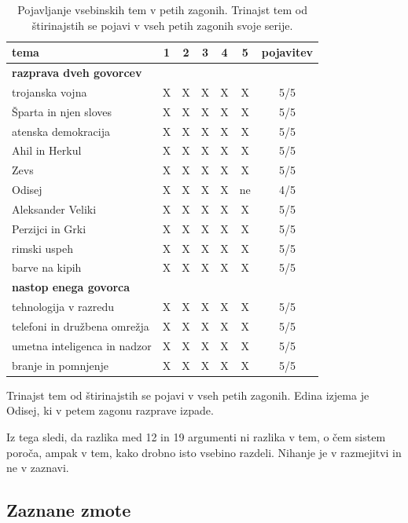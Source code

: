 \documentclass[a4paper, 12pt]{book}
\begin{document}
\begin{table}[H]
\centering
\begin{tabular}{lccccc c}
\toprule
tema & 1 & 2 & 3 & 4 & 5 & pojavitev \\
\midrule
\multicolumn{7}{l}{\textbf{razprava dveh govorcev}} \\
trojanska vojna              & X & X & X & X & X & 5/5 \\
Šparta in njen sloves        & X & X & X & X & X & 5/5 \\
atenska demokracija          & X & X & X & X & X & 5/5 \\
Ahil in Herkul               & X & X & X & X & X & 5/5 \\
Zevs                         & X & X & X & X & X & 5/5 \\
Odisej                       & X & X & X & X & ne & 4/5 \\
Aleksander Veliki            & X & X & X & X & X & 5/5 \\
Perzijci in Grki             & X & X & X & X & X & 5/5 \\
rimski uspeh                 & X & X & X & X & X & 5/5 \\
barve na kipih               & X & X & X & X & X & 5/5 \\
\midrule
\multicolumn{7}{l}{\textbf{nastop enega govorca}} \\
tehnologija v razredu        & X & X & X & X & X & 5/5 \\
telefoni in družbena omrežja & X & X & X & X & X & 5/5 \\
umetna inteligenca in nadzor & X & X & X & X & X & 5/5 \\
branje in pomnjenje          & X & X & X & X & X & 5/5 \\
\bottomrule
\end{tabular}
\caption{Pojavljanje vsebinskih tem v petih zagonih. Trinajst tem od
štirinajstih se pojavi v vseh petih zagonih svoje serije.}
\label{tbl:ujemanje}
\end{table}

Trinajst tem od štirinajstih se pojavi v vseh petih zagonih. Edina izjema je
Odisej, ki v petem zagonu razprave izpade.

Iz tega sledi, da razlika med 12 in 19 argumenti ni razlika v tem, o čem sistem poroča, ampak v
tem, kako drobno isto vsebino razdeli. Nihanje je v razmejitvi in ne v zaznavi.

\subsection{Zaznane zmote}
\label{sec:zmote-meritev}
\end{document}
